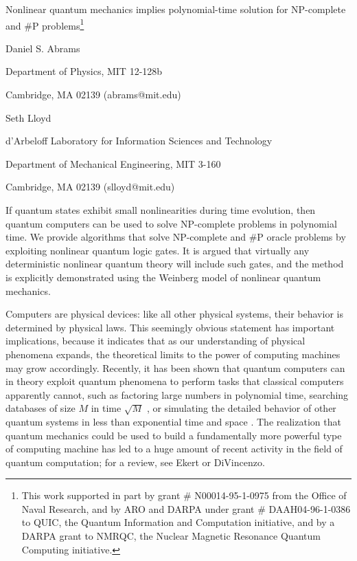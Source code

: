 \documentclass{article}
\begin{document}
\begin{center}
{\Large Nonlinear quantum mechanics implies polynomial-time solution for
NP-complete and \#P problems}\footnote{This work supported in part by grant \#
N00014-95-1-0975 from the Office of Naval Research, and by ARO and DARPA under
grant \# DAAH04-96-1-0386 to QUIC, the Quantum Information and Computation
initiative, and by a DARPA grant to NMRQC, the Nuclear Magnetic Resonance
Quantum Computing initiative.}

\bigskip\medskip

Daniel S. Abrams

Department of Physics, MIT 12-128b

Cambridge, MA 02139 (abrams@mit.edu)

\medskip\medskip

Seth Lloyd

d'Arbeloff Laboratory for Information Sciences and Technology

Department of Mechanical Engineering, MIT 3-160

Cambridge, MA 02139 (slloyd@mit.edu)

\medskip\medskip
\end{center}

If quantum states exhibit small nonlinearities during time evolution, then
quantum computers can be used to solve NP-complete problems in polynomial
time. We provide algorithms that solve NP-complete and \#P oracle problems by
exploiting nonlinear quantum logic gates. It is argued that virtually any
deterministic nonlinear quantum theory will include such gates, and the method
is explicitly demonstrated using the Weinberg model of nonlinear quantum
mechanics.\bigskip\bigskip\bigskip\pagebreak 

Computers are physical devices: like all other physical systems, their
behavior is determined by physical laws. This seemingly obvious statement has
important implications, because it indicates that as our understanding of
physical phenomena expands, the theoretical limits to the power of computing
machines may grow accordingly. Recently, it has been shown that quantum
computers can in theory exploit quantum phenomena to perform tasks that
classical computers apparently cannot, such as factoring large numbers in
polynomial time\cite{Shor}, searching databases of size $M$ in time $\sqrt{M}$
\cite{Grover}, or simulating the detailed behavior of other quantum systems in
less than exponential time and space \cite{Feynman}\cite{Lloyd}\cite{Abrams}.
The realization that quantum mechanics could be used to build a fundamentally
more powerful type of computing machine has led to a huge amount of recent
activity in the field of quantum computation; for a review, see
Ekert\cite{Ekert} or DiVincenzo\cite{DiVincenzo}.
\end{document}
